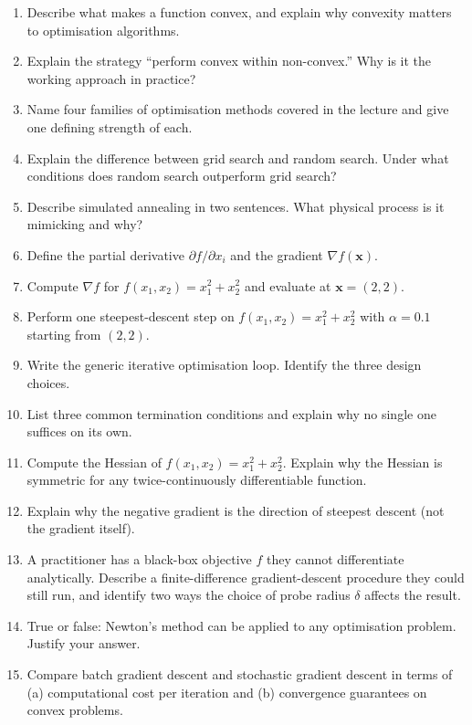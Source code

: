 \documentclass[11pt, a4paper]{article}
\begin{document}
\begin{enumerate}
  \item Describe what makes a function convex, and explain why convexity matters to optimisation algorithms.
  \item Explain the strategy ``perform convex within non-convex.'' Why is it the working approach in practice?
  \item Name four families of optimisation methods covered in the lecture and give one defining strength of each.
  \item Explain the difference between grid search and random search. Under what conditions does random search outperform grid search?
  \item Describe simulated annealing in two sentences. What physical process is it mimicking and why?
  \item Define the partial derivative $\partial f / \partial x_i$ and the gradient $\nabla f(\mathbf{x})$.
  \item Compute $\nabla f$ for $f(x_1, x_2) = x_1^2 + x_2^2$ and evaluate at $\mathbf{x} = (2,2)$.
  \item Perform one steepest-descent step on $f(x_1, x_2) = x_1^2 + x_2^2$ with $\alpha = 0.1$ starting from $(2,2)$.
  \item Write the generic iterative optimisation loop. Identify the three design choices.
  \item List three common termination conditions and explain why no single one suffices on its own.
  \item Compute the Hessian of $f(x_1, x_2) = x_1^2 + x_2^2$. Explain why the Hessian is symmetric for any twice-continuously differentiable function.
  \item Explain why the negative gradient is the direction of steepest descent (not the gradient itself).
  \item A practitioner has a black-box objective $f$ they cannot differentiate analytically. Describe a finite-difference gradient-descent procedure they could still run, and identify two ways the choice of probe radius $\delta$ affects the result.
  \item True or false: Newton's method can be applied to any optimisation problem. Justify your answer.
  \item Compare batch gradient descent and stochastic gradient descent in terms of (a) computational cost per iteration and (b) convergence guarantees on convex problems.
\end{enumerate}
\end{document}
